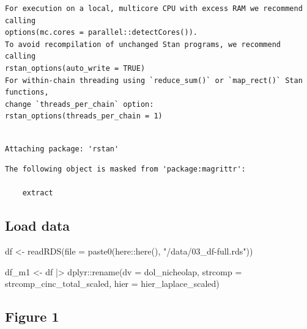 \documentclass[
  12,
  letterpaper,
  DIV=11,
  numbers=noendperiod]{scrartcl}
\newenvironment{Shaded}{\begin{snugshade}}{\end{snugshade}}
\newcommand{\AttributeTok}[1]{\textcolor[rgb]{0.40,0.45,0.13}{#1}}
\newcommand{\FunctionTok}[1]{\textcolor[rgb]{0.28,0.35,0.67}{#1}}
\newcommand{\NormalTok}[1]{\textcolor[rgb]{0.00,0.23,0.31}{#1}}
\newcommand{\OtherTok}[1]{\textcolor[rgb]{0.00,0.23,0.31}{#1}}
\newcommand{\SpecialCharTok}[1]{\textcolor[rgb]{0.37,0.37,0.37}{#1}}
\newcommand{\StringTok}[1]{\textcolor[rgb]{0.13,0.47,0.30}{#1}}
\begin{document}
\begin{verbatim}
For execution on a local, multicore CPU with excess RAM we recommend calling
options(mc.cores = parallel::detectCores()).
To avoid recompilation of unchanged Stan programs, we recommend calling
rstan_options(auto_write = TRUE)
For within-chain threading using `reduce_sum()` or `map_rect()` Stan functions,
change `threads_per_chain` option:
rstan_options(threads_per_chain = 1)
\end{verbatim}

\begin{verbatim}

Attaching package: 'rstan'
\end{verbatim}

\begin{verbatim}
The following object is masked from 'package:magrittr':

    extract
\end{verbatim}

\subsection{Load data}\label{load-data}

\begin{Shaded}
\begin{Highlighting}[numbers=left,,]
\NormalTok{df }\OtherTok{\textless{}{-}} \FunctionTok{readRDS}\NormalTok{(}\AttributeTok{file =} \FunctionTok{paste0}\NormalTok{(here}\SpecialCharTok{::}\FunctionTok{here}\NormalTok{(), }\StringTok{"/data/03\_df{-}full.rds"}\NormalTok{))}

\NormalTok{df\_m1 }\OtherTok{\textless{}{-}}\NormalTok{ df }\SpecialCharTok{|\textgreater{}}
\NormalTok{  dplyr}\SpecialCharTok{::}\FunctionTok{rename}\NormalTok{(}\AttributeTok{dv =}\NormalTok{ dol\_nicheolap,}
                \AttributeTok{strcomp =}\NormalTok{ strcomp\_cinc\_total\_scaled,}
                \AttributeTok{hier =}\NormalTok{ hier\_laplace\_scaled)}
\end{Highlighting}
\end{Shaded}

\newpage

\subsection{Figure 1}\label{figure-1}
\end{document}
